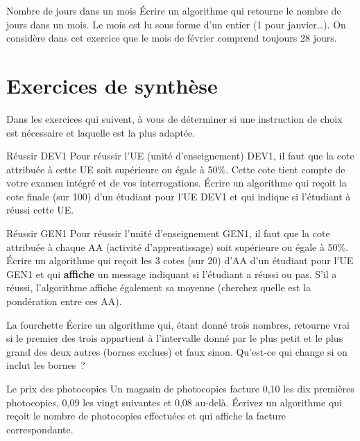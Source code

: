 	\begin{Exercice}{Nombre de jours dans un mois}
		Écrire un algorithme qui retourne le nombre de jours dans un mois. 
		Le mois est lu sous forme d’un entier (1 pour janvier\dots).
		On considère dans cet exercice que le mois de février
		comprend toujours 28 jours.
	\end{Exercice}
		
\section{Exercices de synthèse}

	Dans les exercices qui suivent,
	à vous de déterminer si une instruction de choix est nécessaire
	et laquelle est la plus adaptée.

	\begin{Exercice}{Réussir DEV1}
		Pour réussir l'UE (unité d'enseignement) DEV1,
		il faut que la cote attribuée à cette UE 
		soit supérieure ou égale à 50\%.
		Cette cote tient compte de votre examen intégré
		et de vos interrogations.
		Écrire un algorithme 
		qui reçoit la cote finale (sur 100)
		d'un étudiant pour l'UE DEV1
		et qui indique si l'étudiant à réussi cette UE.
	\end{Exercice}		

	\begin{Exercice}{Réussir GEN1}
		\label{algo:réussirGEN1}
		Pour réussir l'unité d'enseignement GEN1,
		il faut que la cote attribuée à chaque AA (activité d'apprentissage)
		soit supérieure ou égale à 50\%.
		Écrire un algorithme qui reçoit les 3 cotes (sur 20) d'AA d'un étudiant
		pour l'UE GEN1 et qui \textbf{affiche} un message
		indiquant si l'étudiant a réussi ou pas.
		S'il a réussi, l'algorithme affiche également sa moyenne
		(cherchez quelle est la pondération entre ces AA).
	\end{Exercice}		
	
	\begin{Exercice}{La fourchette}
		Écrire un algorithme qui, étant donné trois nombres, 
		retourne vrai si le premier des trois 
		appartient à l’intervalle donné par le plus petit et le plus grand 
		des deux autres (bornes exclues) et faux sinon. 
		Qu’est-ce qui change si on inclut les bornes~?
	\end{Exercice}

	\begin{Exercice}{Le prix des photocopies}
		Un magasin de photocopies facture 0,10 \texteuro{} 
		les dix premières photocopies, 
		0,09 \texteuro{} les vingt suivantes 
		et 0,08 \texteuro{} au-delà. 
		Écrivez un algorithme 
		qui reçoit le nombre de photocopies effectuées 
		et qui affiche la facture correspondante.
	\end{Exercice}

